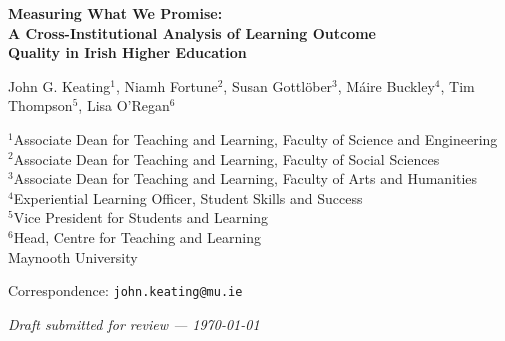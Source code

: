 \documentclass[12pt, a4paper]{article}
\begin{document}
\begin{titlepage}
  \centering
  \vspace*{2cm}

  {\LARGE\bfseries Measuring What We Promise:\\[0.4em]
  A Cross-Institutional Analysis of Learning Outcome\\[0.2em]
  Quality in Irish Higher Education\par}

  \vspace{1.5cm}

  {\large
    John G. Keating$^{1}$,
    Niamh Fortune$^{2}$,
    Susan Gottl{\"o}ber$^{3}$,
    M{\'a}ire Buckley$^{4}$,
    Tim Thompson$^{5}$,
    Lisa O'Regan$^{6}$
  }

  \vspace{0.8cm}

  {\normalsize
    $^{1}$Associate Dean for Teaching and Learning, Faculty of Science and Engineering\\
    $^{2}$Associate Dean for Teaching and Learning, Faculty of Social Sciences\\
    $^{3}$Associate Dean for Teaching and Learning, Faculty of Arts and Humanities\\
    $^{4}$Experiential Learning Officer, Student Skills and Success\\
    $^{5}$Vice President for Students and Learning\\
    $^{6}$Head, Centre for Teaching and Learning\\[0.4em]
    Maynooth University
  }

  \vspace{0.8cm}

  {\normalsize
    Correspondence: \texttt{john.keating@mu.ie}
  }

  \vspace{1.5cm}

  {\normalsize \textit{Draft submitted for review --- \today}}

\end{titlepage}
\end{document}
